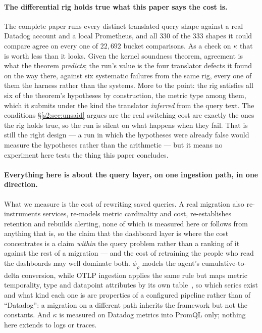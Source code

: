 \paragraph{The differential rig holds true what this paper says the cost is.}
The complete paper runs every distinct translated query shape against a real Datadog
account and a local Prometheus, and all $330$ of the $333$ shapes it could compare agree on
every one of $22{,}692$ bucket comparisons. As a check on $\kappa$ that is worth less than
it looks. Given the kernel soundness theorem, agreement is what the theorem
\emph{predicts}; the run's value is the four translator defects it found on the way there,
against six systematic failures from the same rig, every one of them the harness rather
than the systems. More to the point: the rig satisfies all six of the theorem's hypotheses
by construction, the metric type among them, which it submits under the kind the translator
\emph{inferred} from the query text. The conditions \S\ref{s2:sec:unsaid} argues are the
real switching cost are exactly the ones the rig holds true, so the run is silent on what
happens when they fail. That is still the right design --- a run in which the hypotheses
were already false would measure the hypotheses rather than the arithmetic --- but it means
no experiment here tests the thing this paper concludes.

\paragraph{Everything here is about the query layer, on one ingestion path, in one
direction.}
What we measure is the cost of rewriting saved queries. A real migration also
re-instruments services, re-models metric cardinality and cost, re-establishes retention
and rebuilds alerting, none of which is measured here or follows from anything that is, so
the claim that the dashboard layer is where the cost concentrates is a claim \emph{within}
the query problem rather than a ranking of it against the rest of a migration --- and the
cost of retraining the people who read the dashboards may well dominate both. $\phi_\rho$
models the agent's cumulative-to-delta conversion, while OTLP ingestion applies the same
rule but maps metric temporality, type and datapoint attributes by its own
table~\citep{ddotlp}, so which series exist and what kind each one is are properties of a
configured pipeline rather than of ``Datadog'': a migration on a different path inherits the
framework but not the constants. And $\kappa$ is measured on Datadog metrics into PromQL
only; nothing here extends to logs or traces.

